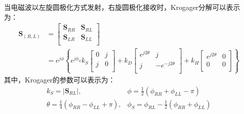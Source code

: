 当电磁波以左旋圆极化方式发射，右旋圆极化接收时，Krogager分解可以表示为：
\begin{equation}
    \begin{aligned}
        \textbf{S}_{(R,L)} & =\left[ \begin{matrix}
                                             \textbf{S}_{RR} & \textbf{S}_{RL} \\
                                             \textbf{S}_{LR} & \textbf{S}_{LL} \\
                                         \end{matrix} \right]
        \\
                           & =e^{j\phi}\left\{ e^{j\phi _S}k_S\left[ \begin{matrix}
                                                                             0 & j \\
                                                                             j & 0 \\
                                                                         \end{matrix} \right] +k_D\left[ \begin{matrix}
                                                                                                             e^{j2\theta} & j              \\
                                                                                                             j            & -e^{-j2\theta} \\
                                                                                                         \end{matrix} \right] +k_H\left[ \begin{matrix}
                                                                                                                                             e^{j2\theta} & 0 \\
                                                                                                                                             0            & 0 \\
                                                                                                                                         \end{matrix} \right] \right\}
    \end{aligned}
\end{equation}
其中，Krogager的参数可以表示为：
\begin{equation}
    \label{Krogager参数}
    \begin{matrix}
        k_S=\left| \textbf{S}_{RL} \right|,                           & \phi =\frac{1}{2}\left( \phi _{RR}+\phi _{LL}-\pi \right)          \\
        \theta =\frac{1}{4}\left( \phi _{RR}-\phi _{LL}+\pi \right) , & \phi _S=\phi _{RL}-\frac{1}{2}\left( \phi _{RR}+\phi _{LL} \right) \\
    \end{matrix}
\end{equation}

